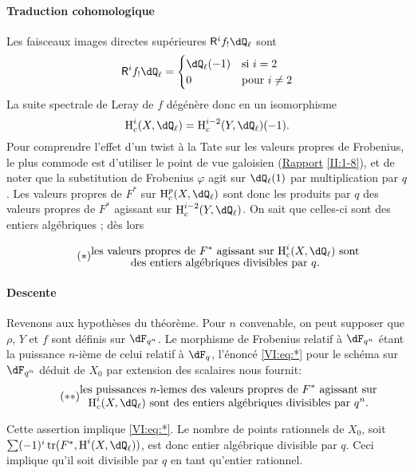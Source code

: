 \paragraph{Traduction cohomologique}
Les faisceaux images directes sup\'erieures $\R^i f_!\dQ_\ell$ sont 
\[
  \R^i f_!\dQ_\ell = \begin{cases}
                       \dQ_\ell(-1) & \text{si $i = 2$} \\
                       0            & \text{pour $i\ne 2$}
                     \end{cases}
\]
La suite spectrale de Leray de $f$ d\'eg\'en\`ere donc en un isomorphisme 
\[
  \h_c^i(X,\dQ_\ell) = \h_c^{i-2}(Y,\dQ_\ell)(-1) \text{.}
\]
Pour comprendre l'effet d'un twist \`a la Tate sur les valeurs propres de 
Frobenius, le plus commode est d'utiliser le point de vue galoisien 
(\hyperref[II]{Rapport} \ref{II:1-8}), et de noter que la substitution de 
Frobenius $\varphi$ agit sur $\dQ_\ell(1)$ par multiplication par $q$. Les 
valeurs propres de $F^\ast$ sur $\h_c^p(X,\dQ_\ell)$ sont donc les produits par 
$q$ des valeurs propres de $F^\ast$ agissant sur $\h_c^{i-2}(Y,\dQ_\ell)$. On 
sait que celles-ci sont des entiers alg\'ebriques \cite[XXI 5.2.2]{sga7}; d\`es 
lors 

\begin{equation*}\tag{$*$}\label{VI:eq:*}
  \substack{\displaystyle\text{les valeurs propres de $F^\ast$ agissant sur $\h_c^i(X,\dQ_\ell)$ sont} \\
  \displaystyle\text{des entiers alg\'ebriques divisibles par $q$.}}
\end{equation*}


\paragraph{Descente}
Revenons aux hypoth\`eses du th\'eor\`eme. Pour $n$ convenable, on peut 
supposer que $\rho$, $Y$ et $f$ sont d\'efinis sur $\dF_{q^n}$. Le morphisme de 
Frobenius relatif \`a $\dF_{q^n}$ \'etant la puissance $n$-i\`eme de celui 
relatif \`a $\dF_q$, l'\'enonc\'e \eqref{VI:eq:*} pour le sch\'ema sur 
$\dF_{q^n}$ d\'eduit de $X_0$ par extension des scalaires nous fournit: 
\begin{equation*}\tag{$**$}\label{VI:eq:**}
  \substack{\displaystyle\text{les puissances $n$-\`iemes des valeurs propres de $F^\ast$ agissant sur} \\ \displaystyle\text{$\h_c^i(X,\dQ_\ell)$ sont des entiers alg\'ebriques divisibles par $q^n$.}}
\end{equation*}

Cette assertion implique \eqref{VI:eq:*}. Le nombre de points rationnels de 
$X_0$, soit $\sum (-1)^i \tr(F^\ast,\h^i(X,\dQ_\ell))$, est donc entier 
alg\'ebrique divisible par $q$. Ceci implique qu'il soit divisible par $q$ en 
tant qu'entier rationnel. 




